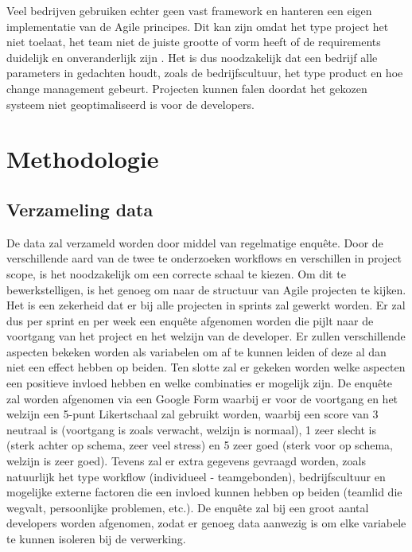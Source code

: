 Veel bedrijven gebruiken echter geen vast framework en hanteren een eigen implementatie van de Agile principes. Dit kan zijn omdat het type project het niet toelaat, het team niet de juiste grootte of vorm heeft of de requirements duidelijk en onveranderlijk zijn \autocite{Naekki2011}. Het is dus noodzakelijk dat een bedrijf alle parameters in gedachten houdt, zoals de bedrijfscultuur, het type product en hoe change management gebeurt. Projecten kunnen falen doordat het gekozen systeem niet geoptimaliseerd is voor de developers.


\section{Methodologie}
\label{sec:methodologie}


\subsection{Verzameling data}
De data zal verzameld worden door middel van regelmatige enquête. Door de verschillende aard van de twee te onderzoeken workflows en verschillen in project scope, is het noodzakelijk om een correcte schaal te kiezen. Om dit te bewerkstelligen, is het genoeg om naar de structuur van Agile projecten te kijken. Het is een zekerheid dat er bij alle projecten in sprints zal gewerkt worden. Er zal dus per sprint en per week een enquête afgenomen worden die pijlt naar de voortgang van het project en het welzijn van de developer. Er zullen verschillende aspecten bekeken worden als variabelen om af te kunnen leiden of deze al dan niet een effect hebben op beiden. Ten slotte zal er gekeken worden welke aspecten een positieve invloed hebben en welke combinaties er mogelijk zijn.
De enquête zal worden afgenomen via een Google Form waarbij er voor de voortgang en het welzijn een 5-punt Likertschaal zal gebruikt worden, waarbij een score van 3 neutraal is (voortgang is zoals verwacht, welzijn is normaal), 1 zeer slecht is (sterk achter op schema, zeer veel stress) en 5 zeer goed (sterk voor op schema, welzijn is zeer goed). Tevens zal er extra gegevens gevraagd worden, zoals natuurlijk het type workflow (individueel - teamgebonden), bedrijfscultuur en mogelijke externe factoren die een invloed kunnen hebben op beiden (teamlid die wegvalt, persoonlijke problemen, etc.).
De enquête zal bij een groot aantal developers worden afgenomen, zodat er genoeg data aanwezig is om elke variabele te kunnen isoleren bij de verwerking.

